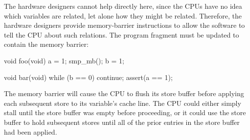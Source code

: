 \begin{sequence}
\iffalse

\item	CPU~1 receives the cache line containing \qco{b} and installs
	it in its cache.
\item	CPU~1 can now finish executing \co{while (b == 0) continue},
	and since it finds that the value of \qco{b} is 1, it proceeds
	to the next statement.
\item	CPU~1 executes the \co{assert(a == 1)}, and, since CPU~1 is
	working with the old value of \qco{a}, this assertion fails.
\item	CPU~1 receives the ``read invalidate'' message, and
	transmits the cache line containing \qco{a} to CPU~0 and
	invalidates this cache line from its own cache.
	But it is too late.
\item	CPU~0 receives the cache line containing \qco{a} and applies
	the buffered store just in time to fall victim to CPU~1's
	failed assertion.

\fi

\end{sequence}

\QuickQuizEnd

The hardware designers cannot help directly here, since the CPUs have
no idea which variables are related, let alone how they might be related.
Therefore, the hardware designers provide memory-barrier instructions
to allow the software to tell the CPU about such relations.
The program fragment must be updated to contain the memory barrier:

\begin{VerbatimN}[fontsize=\footnotesize,samepage=true]
void foo(void)
{
	a = 1;
	smp_mb();
	b = 1;
}

void bar(void)
{
	while (b == 0) continue;
	assert(a == 1);
}
\end{VerbatimN}

The memory barrier  will cause the CPU to flush its store
buffer before applying each subsequent store to its variable's cache line.
The CPU could either simply stall until the store buffer was empty
before proceeding, or it could use the store buffer to hold subsequent
stores until all of the prior entries in the store buffer had been
applied.


